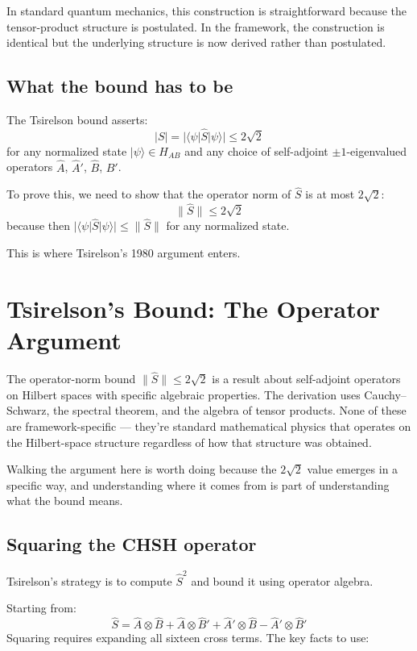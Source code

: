 \documentclass[11pt,a4paper]{article}
\begin{document}
In standard quantum mechanics, this construction is straightforward because the tensor-product structure is postulated. In the framework, the construction is identical but the underlying structure is now derived rather than postulated.

\subsection{What the bound has to be}

The Tsirelson bound asserts:
\[
|S| = |\langle \psi | \hat{S} | \psi \rangle| \leq 2\sqrt{2}
\]
for any normalized state $|\psi\rangle \in H_{AB}$ and any choice of self-adjoint $\pm 1$-eigenvalued operators $\hat{A}$, $\hat{A}'$, $\hat{B}$, $\hat{B}'$.

To prove this, we need to show that the operator norm of $\hat{S}$ is at most $2\sqrt{2}$:
\[
\|\hat{S}\| \leq 2\sqrt{2}
\]
because then $|\langle\psi|\hat{S}|\psi\rangle| \leq \|\hat{S}\|$ for any normalized state.

This is where Tsirelson's 1980 argument enters.

\section{Tsirelson's Bound: The Operator Argument}

The operator-norm bound $\|\hat{S}\| \leq 2\sqrt{2}$ is a result about self-adjoint operators on Hilbert spaces with specific algebraic properties. The derivation uses Cauchy--Schwarz, the spectral theorem, and the algebra of tensor products. None of these are framework-specific --- they're standard mathematical physics that operates on the Hilbert-space structure regardless of how that structure was obtained.

Walking the argument here is worth doing because the $2\sqrt{2}$ value emerges in a specific way, and understanding where it comes from is part of understanding what the bound means.

\subsection{Squaring the CHSH operator}

Tsirelson's strategy is to compute $\hat{S}^2$ and bound it using operator algebra.

Starting from:
\[
\hat{S} = \hat{A} \otimes \hat{B} + \hat{A} \otimes \hat{B}' + \hat{A}' \otimes \hat{B} - \hat{A}' \otimes \hat{B}'
\]
Squaring requires expanding all sixteen cross terms. The key facts to use:
\end{document}
